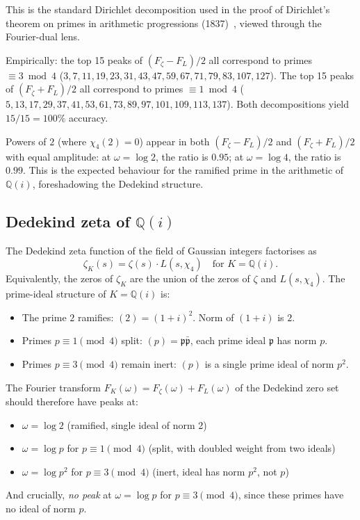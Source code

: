 \documentclass[11pt,a4paper]{article}
\theoremstyle{plain}
\theoremstyle{definition}
\theoremstyle{remark}
\begin{document}
This is the standard Dirichlet decomposition used in the proof of
Dirichlet's theorem on primes in arithmetic progressions
(1837)~\cite{Davenport2000}, viewed through the Fourier-dual lens.

Empirically: the top 15 peaks of $(F_\zeta - F_L)/2$ all correspond
to primes $\equiv 3 \bmod 4$ ($3, 7, 11, 19, 23, 31, 43, 47, 59, 67,
71, 79, 83, 107, 127$). The top 15 peaks of $(F_\zeta + F_L)/2$ all
correspond to primes $\equiv 1 \bmod 4$ ($5, 13, 17, 29, 37, 41, 53,
61, 73, 89, 97, 101, 109, 113, 137$). Both decompositions yield
$15/15 = 100\%$ accuracy.

Powers of $2$ (where $\chi_4(2) = 0$) appear in both $(F_\zeta -
F_L)/2$ and $(F_\zeta + F_L)/2$ with equal amplitude: at $\omega =
\log 2$, the ratio is $0.95$; at $\omega = \log 4$, the ratio is
$0.99$. This is the expected behaviour for the ramified prime in the
arithmetic of $\mathbb{Q}(i)$, foreshadowing the Dedekind structure.

\subsection{Dedekind zeta of $\mathbb{Q}(i)$}
\label{sec:dedekind-Qi}

The Dedekind zeta function of the field of Gaussian integers
factorises as~\cite{Dedekind1871}
\begin{equation}
  \zeta_K(s) = \zeta(s) \cdot L(s, \chi_4) \quad \text{for } K = \mathbb{Q}(i).
  \label{eq:dedekind}
\end{equation}
Equivalently, the zeros of $\zeta_K$ are the union of the zeros of
$\zeta$ and $L(s, \chi_4)$. The prime-ideal structure of $K = \mathbb{Q}(i)$
is:
\begin{itemize}
\item The prime $2$ ramifies: $(2) = (1+i)^2$. Norm of $(1+i)$ is $2$.
\item Primes $p \equiv 1 \pmod{4}$ split: $(p) = \mathfrak{p}\bar{\mathfrak{p}}$,
each prime ideal $\mathfrak{p}$ has norm $p$.
\item Primes $p \equiv 3 \pmod{4}$ remain inert: $(p)$ is a single prime
ideal of norm $p^2$.
\end{itemize}

The Fourier transform $F_K(\omega) = F_\zeta(\omega) + F_L(\omega)$
of the Dedekind zero set should therefore have peaks at:
\begin{itemize}
\item $\omega = \log 2$ (ramified, single ideal of norm 2)
\item $\omega = \log p$ for $p \equiv 1 \pmod{4}$ (split, with doubled weight from two ideals)
\item $\omega = \log p^2$ for $p \equiv 3 \pmod{4}$ (inert, ideal has norm $p^2$, not $p$)
\end{itemize}
And crucially, \emph{no peak} at $\omega = \log p$ for $p \equiv 3 \pmod{4}$,
since these primes have no ideal of norm $p$.
\end{document}
